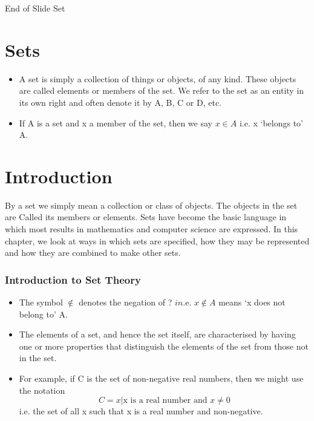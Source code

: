 \documentclass{beamer}
\begin{document}
\begin{frame}

End of Slide Set
\end{frame}



\section{Sets}
\begin{frame}  %
\begin{itemize}
\item A set is simply a collection of things or objects, of any kind. These objects
are called elements or members of the set. We refer to the set as an
entity in its own right and often denote it by A, B, C or D, etc.
\item If A is a set and x a member of the set, then we say $x \in A$ i.e. x ‘belongs to’
A. 
\end{itemize}
\end{frame}
\section{Introduction} %
\begin{frame}
By a set we simply mean a collection or class of objects. The objects in the set are Called its
members or elements. Sets have become the basic language in which most results in mathematics
and computer science are expressed. 
In this chapter, we look at ways in which sets are speciﬁed,
how they may be represented and how they are combined to make other sets.
\end{frame}
\begin{frame}
\frametitle{Introduction to Set Theory}
\begin{itemize}
\item The symbol $\notin$ denotes the negation of ? $in$.e. $x \notin A$ means ‘x does not
belong to’ A.
\item The elements of a set, and hence the set itself, are characterised by having
one or more properties that distinguish the elements of the set from those
not in the set.
\item For example, if C is the set of non-negative real numbers, then we
might use the notation
\[C = {x | \mbox{x is a real number and }x \neq 0}\]
i.e. the set of all x such that x is a real number and non-negative.
\end{itemize}
\end{frame}
\end{document}
